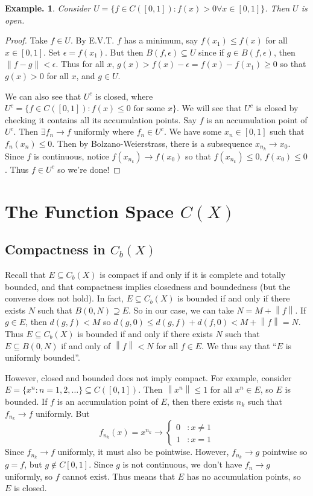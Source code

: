 \documentclass[11pt, a4paper]{memoir}
\newcommand{\norm}[1]{\ensuremath{\left\lVert#1\right\rVert}}
\theoremstyle{change}
\theoremstyle{plain}
\theoremstyle{nonumberplain}
\newtheorem{example}{Example.}
\newtheorem{proof}{Proof}
\numberwithin{equation}{section}
\begin{document}
\begin{example}
    Consider $U=\{f\in C([0,1]):f(x)>0\forall x\in[0,1]\}$. Then $U$ is open.
\end{example}
\begin{proof}
    Take $f\in U$.
    By E.V.T. $f$ has a minimum, say $f(x_1)\leq f(x)$ for all $x\in[0,1]$.
    Set $\epsilon=f(x_1)$.
    But then $B(f,\epsilon)\subseteq U$ since if $g\in B(f,\epsilon)$, then $\norm{f-g}<\epsilon$.
    Thus for all $x$, $g(x)>f(x)-\epsilon=f(x)-f(x_1)\geq 0$ so that $g(x)>0$ for all $x$, and $g\in U$.

    We can also see that $U^c$ is closed, where $U^c=\{f\in C([0,1]):\text{$f(x)\leq 0$ for some $x$}\}$.
    We will see that $U^c$ is closed by checking it contains all its accumulation points.
    Say $f$ is an accumulation point of $U^c$.
    Then $\exists f_n\to f$ uniformly where $f_n\in U^c$.
    We have some $x_n\in[0,1]$ such that $f_n(x_n)\leq 0$.
    Then by Bolzano-Weierstrass, there is a subsequence $x_{n_k}\to x_0$.
    Since $f$ is continuous, notice $f(x_{n_k})\to f(x_0)$ so that $f(x_{n_k})\leq 0$, $f(x_0)\leq 0$.
    Thus $f\in U^c$ so we're done!
\end{proof}
\chapter{The Function Space $C(X)$}
\section{Compactness in $C_b(X)$}
Recall that $E\subseteq C_b(X)$ is compact if and only if it is complete and totally bounded, and that compactness implies closedness and boundedness (but the converse does not hold).
In fact, $E\subseteq C_b(X)$ is bounded if and only if there exists $N$ such that $B(0,N)\supseteq E$.
So in our case, we can take $N=M+\norm{f}$.
If $g\in E$, then $d(g,f)<M$ so $d(g,0)\leq d(g,f)+d(f,0)<M+\norm{f}=N$.
Thus $E\subseteq C_b(X)$ is bounded if and only if there exists $N$ such that $E\subseteq B(0,N)$ if and only of $\norm{f}<N$ for all $f\in E$.
We thus say that ``$E$ is uniformly bounded''.

However, closed and bounded does not imply compact.
For example, consider $E=\{x^n:n=1,2,\ldots\}\subseteq C([0,1])$.
Then $\norm{x^n}\leq 1$ for all $x^n\in E$, so $E$ is bounded.
If $f$ is an accumulation point of $E$, then there exists $n_k$ such that $f_{n_k}\to f$ uniformly.
But
\[f_{n_k}(x)=x^{n_k}\to
    \begin{cases}
        0 &:x\neq 1\\
        1 &:x = 1
    \end{cases}
\]
Since $f_{n_k}\to f$ uniformly, it must also be pointwise.
However, $f_{n_k}\to g$ pointwise so $g=f$, but $g\notin C[0,1]$.
Since $g$ is not continuous, we don't have $f_n\to g$ uniformly, so $f$ cannot exist.
Thus means that $E$ has no accumulation points, so $E$ is closed.
\end{document}
